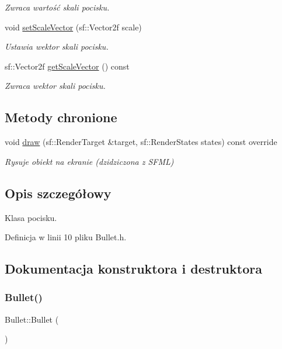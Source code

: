 \begin{DoxyCompactItemize}
\begin{DoxyCompactList}\small\item\em Zwraca wartość skali pocisku. \end{DoxyCompactList}\item 
void \mbox{\hyperlink{class_bullet_ae6b6d87e11805a0e76f04fb7187d674e}{set\+Scale\+Vector}} (sf\+::\+Vector2f scale)
\begin{DoxyCompactList}\small\item\em Ustawia wektor skali pocisku. \end{DoxyCompactList}\item 
sf\+::\+Vector2f \mbox{\hyperlink{class_bullet_a506586cdb96da5f682ea48139627096d}{get\+Scale\+Vector}} () const
\begin{DoxyCompactList}\small\item\em Zwraca wektor skali pocisku. \end{DoxyCompactList}\end{DoxyCompactItemize}
\subsection*{Metody chronione}
\begin{DoxyCompactItemize}
\item 
void \mbox{\hyperlink{class_bullet_a36d1d889cfc8095dcd9631a766b35cf0}{draw}} (sf\+::\+Render\+Target \&target, sf\+::\+Render\+States states) const override
\begin{DoxyCompactList}\small\item\em Rysuje obiekt na ekranie (dzidziczona z S\+F\+ML) \end{DoxyCompactList}\end{DoxyCompactItemize}


\subsection{Opis szczegółowy}
Klasa pocisku. 

Definicja w linii 10 pliku Bullet.\+h.



\subsection{Dokumentacja konstruktora i destruktora}
\mbox{\label{class_bullet_a5e8fd8844271779a2e6cf28a72b54da9}} 
\subsubsection{\texorpdfstring{Bullet()}{Bullet()}\hspace{0.1cm}{\footnotesize\ttfamily [1/2]}}
{\footnotesize\ttfamily Bullet\+::\+Bullet (\begin{DoxyParamCaption}{ }\end{DoxyParamCaption})\hspace{0.3cm}{\ttfamily [delete]}}




